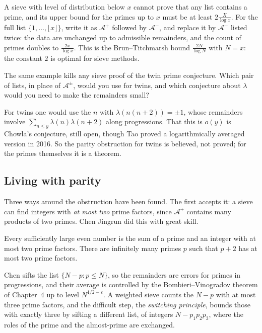 A sieve with level of distribution below $x$ cannot prove that any list contains a prime, and its upper bound for the primes up to $x$ must be at least $2\frac X{\log x}$. For the full list $\{1,\dots,\lfloor x\rfloor\}$, write it as $\mathcal A^+$ followed by $\mathcal A^-$, and replace it by $\mathcal A^-$ listed twice: the data are unchanged up to admissible remainders, and the count of primes doubles to $\frac{2x}{\log x}$. This is the Brun--Titchmarsh bound $\frac{2N}{\log N}$ with $N=x$: the constant $2$ is optimal for sieve methods.

\begin{think}
The same example kills any sieve proof of the twin prime conjecture. Which pair of lists, in place of $\mathcal A^\pm$, would you use for twins, and which conjecture about $\lambda$ would you need to make the remainders small?
\end{think}

For twins one would use the $n$ with $\lambda(n(n+2))=\pm1$, whose remainders involve $\sum_{n\le y}\lambda(n)\lambda(n+2)$ along progressions. That this is $o(y)$ is Chowla's conjecture, still open, though Tao proved a logarithmically averaged version in 2016. So the parity obstruction for twins is believed, not proved; for the primes themselves it is a theorem.

\subsection*{Living with parity}

Three ways around the obstruction have been found. The first accepts it: a sieve can find integers with \emph{at most two} prime factors, since $\mathcal A^+$ contains many products of two primes. Chen Jingrun did this with great skill.

\begin{theorem}\label{thm:chen}
Every sufficiently large even number is the sum of a prime and an integer with at most two prime factors. There are infinitely many primes $p$ such that $p+2$ has at most two prime factors.
\end{theorem}

Chen sifts the list $\{N-p:p\le N\}$, so the remainders are errors for primes in progressions, and their average is controlled by the Bombieri--Vinogradov theorem of Chapter~4 up to level $N^{1/2-\varepsilon}$. A weighted sieve counts the $N-p$ with at most three prime factors, and the difficult step, the \emph{switching principle}, bounds those with exactly three by sifting a different list, of integers $N-p_1p_2p_3$, where the roles of the prime and the almost-prime are exchanged.

